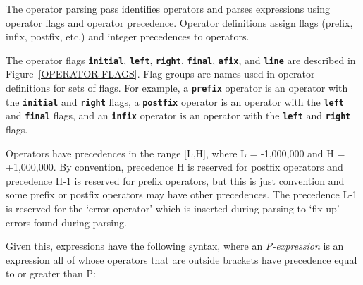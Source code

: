 \documentclass[12pt]{article}
\newcommand{\TT}[1]{{\tt \bfseries #1}}
\begin{document}
The operator parsing pass identifies operators
and parses expressions using operator flags 
and operator precedence.
Operator definitions assign flags (prefix, infix, postfix, etc.)
and integer precedences to operators.

The operator flags \TT{initial}, \TT{left}, \TT{right}, \TT{final},
\TT{afix}, and \TT{line} are described in Figure~\ref{OPERATOR-FLAGS}.
Flag groups are names used in operator definitions for sets of flags.
For example, a \TT{prefix} operator is an operator with the
\TT{initial} and \TT{right} flags, a \TT{postfix} operator
is an operator with the \TT{left} and \TT{final} flags, and an
\TT{infix} operator is an operator with the \TT{left} and \TT{right}
flags.

Operators have precedences in the range [L,H],
where L = -1,000,000 and H = +1,000,000.  By convention,
precedence H is reserved for postfix operators and precedence H-1 is
reserved for prefix operators, but this is just convention and
some prefix or postfix operators may have other precedences.
The precedence L-1 is reserved for the `error operator' which is
inserted during parsing to `fix up' errors found during parsing.

Given this, expressions have the following syntax,
where an {\em P-expression}
is an expression all of whose operators that are outside brackets
have precedence equal to or greater than P:
\end{document}
